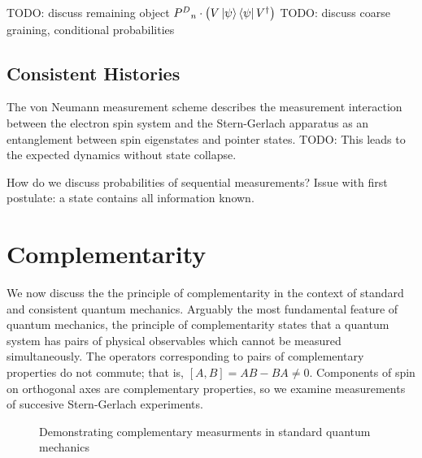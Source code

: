 TODO: discuss remaining object ${P^D}_n \cdot \left(V\ket{\psi}\bra{\psi}V^\dagger\right)$
TODO: discuss coarse graining, conditional probabilities
\section{Consistent Histories}
The von Neumann measurement scheme describes the measurement interaction between the electron spin system and the Stern-Gerlach apparatus as an entanglement between spin eigenstates and pointer states. TODO: This leads to the expected dynamics without state collapse.

How do we discuss probabilities of sequential measurements?
Issue with first postulate: a state contains all information known.

\chapter{Complementarity}
We now discuss the the principle of complementarity in the context of standard and consistent quantum mechanics. Arguably the most fundamental feature of quantum mechanics, the principle of complementarity states that a quantum system has pairs of physical observables which cannot be measured simultaneously. The operators corresponding to pairs of complementary properties do not commute; that is, $[A,B] = AB - BA \neq 0$. Components of spin on orthogonal axes are complementary properties, so we examine measurements of succesive Stern-Gerlach experiments.

\begin{figure}
\centering\CaptionFontSize
{}
\caption[Insert an abbreviated caption here to show in the List of Figures]
{Demonstrating complementary measurments in standard quantum mechanics}
\label{Figure:Intro:FigureExampleC}
\end{figure}
